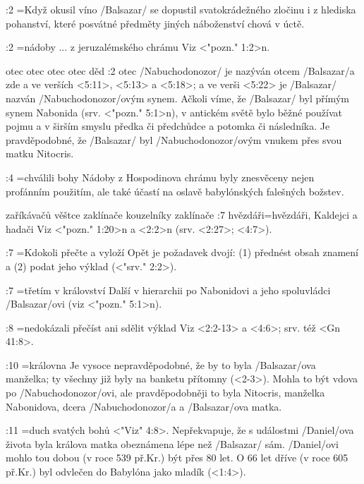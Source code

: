      
:2 {}={Když okusil víno}  \x/Balsazar/ se dopustil svatokrádežného zločinu i z hlediska pohanství, které   posvátné předměty jiných náboženství chová v úctě.

:2 {}={nádoby ... z jeruzalémského chrámu} Viz  <"pozn." 1:2>n. 
     
    {otec} %
    {otec}  %
    {otec} %
    {otec}  %
    {děd}  %
:2 {otec}  \x/Nabuchodonozor/ je nazýván otcem \x/Balsazar/a zde a ve verších 
<5:11>, <5:13> a <5:18>; a ve verši <5:22> je \x/Balsazar/ nazván \x/Nabuchodonozor/ovým synem.
Ačkoli víme, že \x/Balsazar/ byl přímým synem Nabonida  (srv. <"pozn." 5:1>n), v antickém světě bylo běžné používat pojmu  a  v širším smyslu předka či předchůdce a potomka či následníka. Je pravděpodobné, že \x/Balsazar/ byl \x/Nabuchodonozor/ovým vnukem přes svou matku Nitocris.
     
:4 {}={chválili bohy} Nádoby z Hospodinova chrámu byly znesvěceny nejen profánním použitím, ale také účastí na oslavě babylónských falešných božstev. 
     
    {zaříkávačů}   %
    {věštce}   %
    {zaklínače}   %
    {kouzelníky}   %
    {zaklínače}   %
:7 {hvězdáři}={hvězdáři, Kaldejci a hadači} Viz  <"pozn." 1:20>n a  <2:2>n (srv. <2:27>; <4:7>). 
     
:7 {}={Kdokoli přečte a vyloží} Opět je požadavek dvojí: (1) přednést obsah znamení a (2) podat jeho výklad  (<"srv." 2:2>).      
     
:7 {}={třetím v království} Další v hierarchii po Nabonidovi a jeho spoluvládci \x/Balsazar/ovi  (viz <"pozn." 5:1>n).     
     
:8 {}={nedokázali přečíst ani sdělit výklad} Viz  <2:2-13> a  <4:6>; srv. též <Gn 41:8>.   
 
:10 {}={královna} Je vysoce nepravděpodobné, že by to byla \x/Balsazar/ova manželka; ty všechny již byly na banketu přítomny  (<2-3>). Mohla to být vdova po \x/Nabuchodonozor/ovi, ale pravděpodobněji to byla  Nitocris, manželka Nabonidova, dcera \x/Nabuchodonozor/a a \x/Balsazar/ova matka.
     
:11 {}={duch svatých bohů}   <"Viz" 4:8>. 
Nepřekvapuje, že s událostmi \x/Daniel/ova života byla králova matka obeznámena lépe než  \x/Balsazar/ sám. \x/Daniel/ovi mohlo tou dobou (v roce 539 př.Kr.) být přes 80 let. O 66 let dříve (v roce 605 př.Kr.) byl odvlečen do Babylóna jako mladík (<1:4>).     
     

